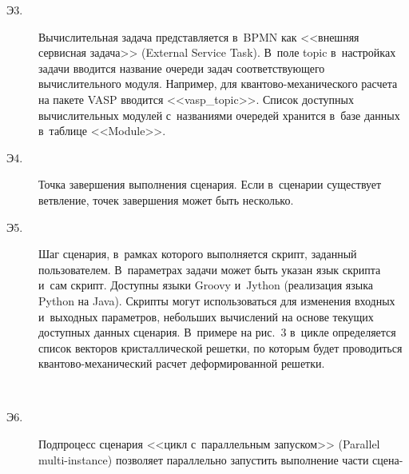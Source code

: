 \begin{multicols}{2}
\begin{description}
\item[Э3.] Вычислительная задача пред\-став\-ля\-ет\-ся в~BPMN как <<внеш\-няя 
сервисная задача>> (External Service Task). В~поле topic в~настройках 
задачи вводится название очереди задач со\-от\-вет\-ст\-ву\-юще\-го 
вы\-чис\-ли\-тель\-но\-го модуля. Например, для  
кван\-то\-во-ме\-ха\-ни\-че\-ско\-го расчета на пакете VASP вводится 
<<vasp\_topic>>. Список до\-ступ\-ных вы\-чис\-ли\-тель\-ных модулей 
с~названиями очередей хранится в~базе данных в~таб\-ли\-це <<Module>>.\\[-15pt]

\item[Э4.] Точка завершения выполнения сценария. Если в~сценарии существует 
ветвление, точек завершения может быть несколько.



    \item[Э5.] Шаг сценария, в~рамках которого выполняется скрипт, заданный 
пользователем. В~па\-ра\-мет\-рах задачи может быть указан язык скрип\-та и~сам 
скрипт. Доступны языки Groovy и~Jython (реализация языка Python на Java). 
Скрип\-ты могут использоваться для изменения входных и~выходных па\-ра\-мет\-ров, 
небольших вы\-чис\-ле\-ний на основе текущих до\-ступ\-ных данных сценария. 
В~примере на рис.~3 в~цик\-ле определяется список векторов 
крис\-тал\-ли\-че\-ской решетки, по которым будет проводиться кван\-то\-во-ме\-ха\-ни\-че\-ский 
рас\-чет деформированной решетки.\\[-19.5pt]

\begin{figure*}[b] %
\vspace*{1pt}
  \begin{center}  
    \mbox{%
\epsfxsize=163mm
}

\end{center}
\vspace*{-9pt}
\end{figure*}
    
    \item[Э6.] Подпроцесс сценария <<цикл с~параллельным запуском>>  
(Parallel multi-instance) позволяет параллельно запустить выполнение час\-ти 
сцена- %

\columnbreak


\end{description}
\end{multicols}
